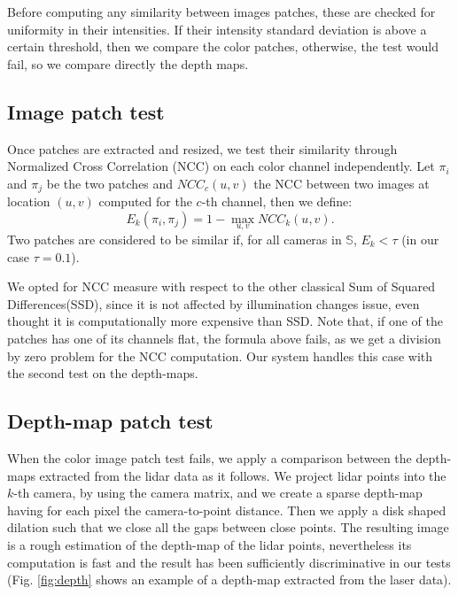 Before computing any similarity between images patches, these are checked for uniformity in their intensities. If their intensity standard deviation is above a certain threshold, then we compare the color patches, otherwise, the test would fail, so we compare directly the depth maps.

\subsection{Image patch test}%
Once patches are extracted and resized, we test their similarity through Normalized Cross Correlation (NCC) on each color channel independently. 
Let $\pi_i$ and $\pi_j$ be the two patches and $NCC_c(u,v)$ the NCC between two images at location $(u,v)$ computed for the $c$-th channel, then we define:
\begin{equation}
 E_k(\pi_i, \pi_j) = 1 - \max_{u,v}NCC_k(u,v).
\end{equation}
Two patches are considered to be similar if, for all cameras in $\mathbb{S}$, $E_k < \tau$ (in our case $\tau=0.1$). 

We opted for NCC measure with respect to the other classical Sum of Squared Differences(SSD), since it is not affected by illumination changes issue, even thought it is computationally more expensive than SSD. Note that, if one of the patches has one of its channels flat, the formula above fails, as we get a division by zero problem for the NCC computation. Our system handles this case with the second test on the depth-maps. 

\subsection{Depth-map patch test}%
When the color image patch test fails, we apply a comparison between the depth-maps extracted from the lidar data as it follows.
We project lidar points into the $k$-th camera, by using the camera matrix, and we create a sparse depth-map having for each pixel the camera-to-point distance. Then we apply a disk shaped dilation such that we close all the gaps between close points.
The resulting image is a rough estimation of the depth-map of the lidar points, nevertheless its computation is fast and the result has been sufficiently discriminative in our tests (Fig. \ref{fig:depth} shows an example of a depth-map extracted from the laser data).



